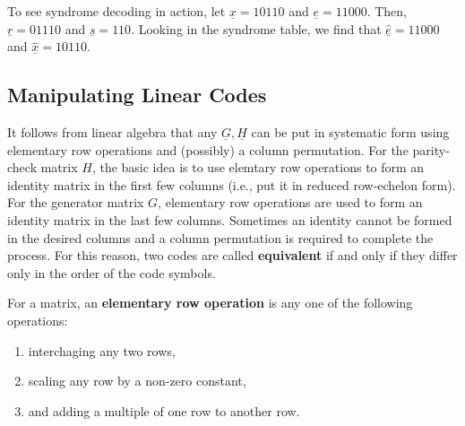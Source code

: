 \begin{example}
To see syndrome decoding in action, let $\underline{x}=10110$ and $\underline{e}=11000$.
Then, $\underline{r}=01110$ and $\underline{s}=110$.
Looking in the syndrome table, we find that $\underline{\hat{e}}=11000$ and $\underline{\hat{x}}=10110$.
\end{example}

\subsection{Manipulating Linear Codes}

It follows from linear algebra that any $\underline{G},\underline{H}$ can be put in systematic form using elementary row operations and (possibly) a column permutation.
For the parity-check matrix $H$, the basic idea is to use elemtary row operations to form an identity matrix in the first few columns (i.e., put it in reduced row-echelon form).
For the generator matrix $G$, elementary row operations are used to form an identity matrix in the last few columns.
Sometimes an identity cannot be formed in the desired columns and a column permutation is required to complete the process.
For this reason, two codes are called \textbf{equivalent} if and only if they differ only in the order of the code symbols.

\begin{definition}
For a matrix, an \textbf{elementary row operation} is any one of the following operations:
\begin{enumerate}
\item interchaging any two rows,
\item scaling any row by a non-zero constant,
\item and adding a multiple of one row to another row.
\end{enumerate}
\end{definition}

